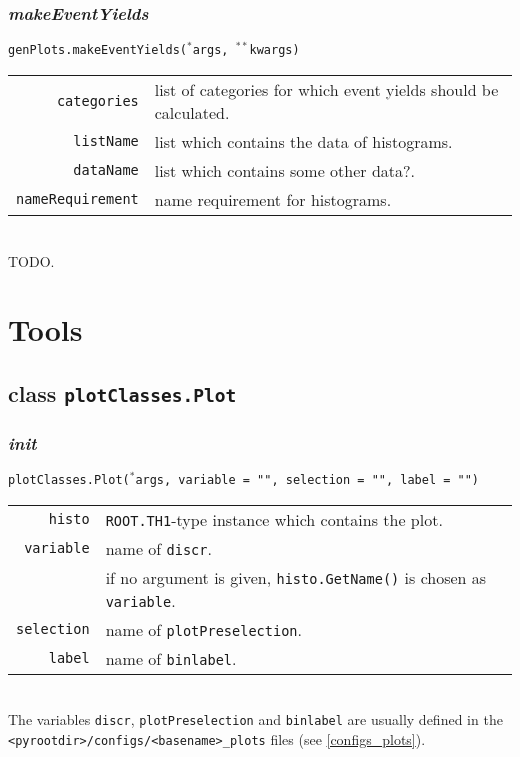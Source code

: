 \documentclass[12pt, a4paper]{article}
\newcommand{\args}{$^*$args}
\newcommand{\kwargs}{$^{**}$kwargs}
\begin{document}
\subsubsection{\textit{makeEventYields}}
\texttt{genPlots.makeEventYields(\args, \kwargs)}\\
\begin{tabular}{r|l}
\hline
\texttt{categories}			&	list of categories for which event yields should be calculated.\\
\texttt{listName}			&	list which contains the data of histograms.\\
\texttt{dataName}			&	list which contains some other data?.\\
\texttt{nameRequirement}	&	name requirement for histograms.\\
\hline
\end{tabular}
\\
TODO.


\newpage

\section{Tools}

\subsection{class \texttt{plotClasses.Plot}}

\subsubsection{\textit{init}}
\texttt{plotClasses.Plot(\args, variable = "", selection = "", label = "")}\\
\begin{tabular}{r|l}
\hline
\texttt{histo}		&	\texttt{ROOT.TH1}-type instance which contains the plot.\\
\texttt{variable}	&	name of \texttt{discr}.\\
					& 	if no argument is given, \texttt{histo.GetName()} is chosen as \texttt{variable}.\\
\texttt{selection}	&	name of \texttt{plotPreselection}.\\
\texttt{label}		& 	name of \texttt{binlabel}.\\
\hline
\end{tabular}
\\
The variables \texttt{discr}, \texttt{plotPreselection} and \texttt{binlabel} are usually defined in the \texttt{<pyrootdir>/configs/<basename>\_plots} files (see \ref{configs_plots}).
\end{document}
